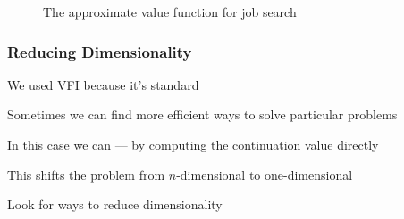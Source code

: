 \begin{frame}

    \begin{figure}
        \centering
        \caption{\label{f:iid_job_search_3} The approximate value function for job
        search}
    \end{figure}

\end{frame}


\begin{frame}
    \frametitle{Reducing Dimensionality}

    We used VFI because it's standard

            \vspace{0.5em}
            \vspace{0.5em}
    Sometimes we can find more efficient ways to solve particular problems

            \vspace{0.5em}
            \vspace{0.5em}
    In this case we can --- by computing the continuation value directly

            \vspace{0.5em}
            \vspace{0.5em}
    This shifts the problem from $n$-dimensional to one-dimensional

        \vspace{0.5em}
        \vspace{0.5em}
         Look for ways to reduce dimensionality
\end{frame}


